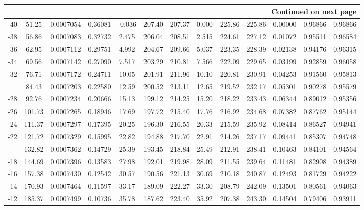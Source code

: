 \documentclass[12pt,a3paper]{article}
\begin{document}
\begin{enumerate}
\begin{center}
\begin{longtable}{c c c c c c c c c c c c c}
\midrule
\multicolumn{13}{r}{{Continued on next page}} \\
\bottomrule
\endfoot

\bottomrule\bottomrule
\endlastfoot

-40 & 51.25 & 0.0007054 & 0.36081 & -0.036 & 207.40 & 207.37 & 0.000 & 225.86 & 225.86 & 0.00000 & 0.96866 & 0.96866 \\
-38 & 56.86 & 0.0007083 & 0.32732 & 2.475 & 206.04 & 208.51 & 2.515 & 224.61 & 227.12 & 0.01072 & 0.95511 & 0.96584 \\
-36 & 62.95 & 0.0007112 & 0.29751 & 4.992 & 204.67 & 209.66 & 5.037 & 223.35 & 228.39 & 0.02138 & 0.94176 & 0.96315 \\
-34 & 69.56 & 0.0007142 & 0.27090 & 7.517 & 203.29 & 210.81 & 7.566 & 222.09 & 229.65 & 0.03199 & 0.92859 & 0.96058 \\
-32 & 76.71 & 0.0007172 & 0.24711 & 10.05 & 201.91 & 211.96 & 10.10 & 220.81 & 230.91 & 0.04253 & 0.91560 & 0.95813 \\
\addlinespace
-30 & 84.43 & 0.0007203 & 0.22580 & 12.59 & 200.52 & 213.11 & 12.65 & 219.52 & 232.17 & 0.05301 & 0.90278 & 0.95579 \\
-28 & 92.76 & 0.0007234 & 0.20666 & 15.13 & 199.12 & 214.25 & 15.20 & 218.22 & 233.43 & 0.06344 & 0.89012 & 0.95356 \\
-26 & 101.73 & 0.0007265 & 0.18946 & 17.69 & 197.72 & 215.40 & 17.76 & 216.92 & 234.68 & 0.07382 & 0.87762 & 0.95144 \\
-24 & 111.37 & 0.0007297 & 0.17395 & 20.25 & 196.30 & 216.55 & 20.33 & 215.59 & 235.92 & 0.08414 & 0.86527 & 0.94941 \\
-22 & 121.72 & 0.0007329 & 0.15995 & 22.82 & 194.88 & 217.70 & 22.91 & 214.26 & 237.17 & 0.09441 & 0.85307 & 0.94748 \\
\addlinespace
-20 & 132.82 & 0.0007362 & 0.14729 & 25.39 & 193.45 & 218.84 & 25.49 & 212.91 & 238.41 & 0.10463 & 0.84101 & 0.94564 \\
-18 & 144.69 & 0.0007396 & 0.13583 & 27.98 & 192.01 & 219.98 & 28.09 & 211.55 & 239.64 & 0.11481 & 0.82908 & 0.94389 \\
-16 & 157.38 & 0.0007430 & 0.12542 & 30.57 & 190.56 & 221.13 & 30.69 & 210.18 & 240.87 & 0.12493 & 0.81729 & 0.94222 \\
-14 & 170.93 & 0.0007464 & 0.11597 & 33.17 & 189.09 & 222.27 & 33.30 & 208.79 & 242.09 & 0.13501 & 0.80561 & 0.94063 \\
-12 & 185.37 & 0.0007499 & 0.10736 & 35.78 & 187.62 & 223.40 & 35.92 & 207.38 & 243.30 & 0.14504 & 0.79406 & 0.93911 \\

\end{longtable}
\end{center}
\end{enumerate}
\end{document}
